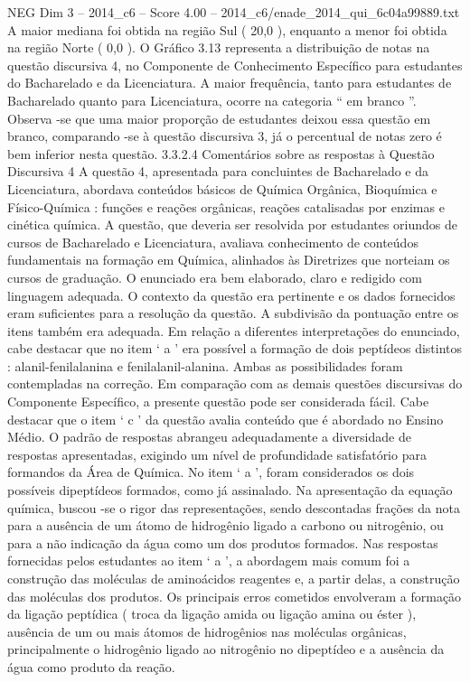 \begin{textsample}{NEG Dim 3 – 2014\_c6 – Score 4.00 – 2014\_c6/enade\_2014\_qui\_6c04a99889.txt}
A maior mediana foi obtida na região Sul ( 20,0 ), enquanto a menor foi obtida na região Norte ( 0,0 ).
O Gráfico 3.13 representa a distribuição de notas na questão discursiva 4, no Componente de Conhecimento Específico para estudantes do Bacharelado e da Licenciatura.
A maior frequência, tanto para estudantes de Bacharelado quanto para Licenciatura, ocorre na categoria “ em branco ”.
Observa -se que uma maior proporção de estudantes deixou essa questão em branco, comparando -se à questão discursiva 3, já o percentual de notas zero é bem inferior nesta questão. 3.3.2.4 Comentários sobre as respostas à Questão Discursiva 4 A questão 4, apresentada para concluintes de Bacharelado e da Licenciatura, abordava conteúdos básicos de Química Orgânica, Bioquímica e Físico-Química : funções e reações orgânicas, reações catalisadas por enzimas e cinética química.
A questão, que deveria ser resolvida por estudantes oriundos de cursos de Bacharelado e Licenciatura, avaliava conhecimento de conteúdos fundamentais na formação em Química, alinhados às Diretrizes que norteiam os cursos de graduação.
O enunciado era bem elaborado, claro e redigido com linguagem adequada.
O contexto da questão era pertinente e os dados fornecidos eram suficientes para a resolução da questão.
A subdivisão da pontuação entre os itens também era adequada.
Em relação a diferentes interpretações do enunciado, cabe destacar que no item ‘ a ’ era possível a formação de dois peptídeos distintos : alanil-fenilalanina e fenilalanil-alanina.
Ambas as possibilidades foram contempladas na correção.
Em comparação com as demais questões discursivas do Componente Específico, a presente questão pode ser considerada fácil.
Cabe destacar que o item ‘ c ’ da questão avalia conteúdo que é abordado no Ensino Médio.
O padrão de respostas abrangeu adequadamente a diversidade de respostas apresentadas, exigindo um nível de profundidade satisfatório para formandos da Área de Química.
No item ‘ a ’, foram considerados os dois possíveis dipeptídeos formados, como já assinalado.
Na apresentação da equação química, buscou -se o rigor das representações, sendo descontadas frações da nota para a ausência de um átomo de hidrogênio ligado a carbono ou nitrogênio, ou para a não indicação da água como um dos produtos formados.
Nas respostas fornecidas pelos estudantes ao item ‘ a ’, a abordagem mais comum foi a construção das moléculas de aminoácidos reagentes e, a partir delas, a construção das moléculas dos produtos.
Os principais erros cometidos envolveram a formação da ligação peptídica ( troca da ligação amida ou ligação amina ou éster ), ausência de um ou mais átomos de hidrogênios nas moléculas orgânicas, principalmente o hidrogênio ligado ao nitrogênio no dipeptídeo e a ausência da água como produto da reação.

\end{textsample}
